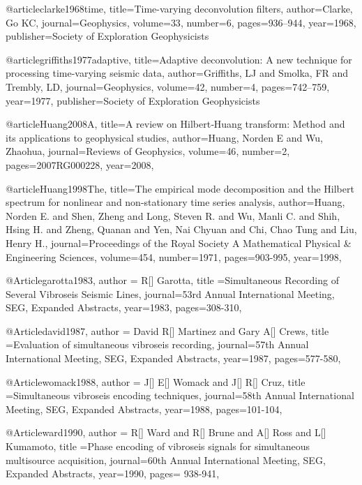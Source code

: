 {@article{clarke1968time,
  title={Time-varying deconvolution filters},
  author={Clarke, Go KC},
  journal={Geophysics},
  volume={33},
  number={6},
  pages={936--944},
  year={1968},
  publisher={Society of Exploration Geophysicists}
}

@article{griffiths1977adaptive,
  title={Adaptive deconvolution: A new technique for processing time-varying seismic data},
  author={Griffiths, LJ and Smolka, FR and Trembly, LD},
  journal={Geophysics},
  volume={42},
  number={4},
  pages={742--759},
  year={1977},
  publisher={Society of Exploration Geophysicists}
}

@article{Huang2008A,
  title={A review on {H}ilbert‐{H}uang transform: {M}ethod and its applications to geophysical studies},
  author={Huang, Norden E and Wu, Zhaohua},
  journal={Reviews of Geophysics},
  volume={46},
  number={2},
  pages={2007RG000228},
  year={2008},
}

@article{Huang1998The,
  title={The empirical mode decomposition and the Hilbert spectrum for nonlinear and non-stationary time series analysis},
  author={Huang, Norden E. and Shen, Zheng and Long, Steven R. and Wu, Manli C. and Shih, Hsing H. and Zheng, Quanan and Yen, Nai Chyuan and Chi, Chao Tung and Liu, Henry H.},
  journal={Proceedings of the Royal Society A Mathematical Physical \& Engineering Sciences},
  volume={454},
  number={1971},
  pages={903-995},
  year={1998},
}


@Article{garotta1983,
  author = {R[] Garotta},
  title ={Simultaneous Recording of Several Vibroseis Seismic Lines},
  journal={53rd Annual International Meeting, SEG, Expanded Abstracts},
  year=1983,
  pages={308-310},
}

@Article{david1987,
  author = {David R[] Martinez and Gary A[] Crews},
  title ={Evaluation of simultaneous vibroseis recording},
  journal={57th Annual International Meeting, SEG, Expanded Abstracts},
  year=1987,
  pages={577-580},
}

@Article{womack1988,
  author = {J[] E[] Womack and J[] R[] Cruz},
  title ={Simultaneous vibroseis encoding techniques},
  journal={58th Annual International Meeting, SEG, Expanded Abstracts},
  year=1988,
  pages={101-104},
}

@Article{ward1990,
  author = {R[] Ward and R[] Brune and A[] Ross and L[] Kumamoto},
  title ={Phase encoding of vibroseis signals for simultaneous multisource acquisition},
  journal={60th Annual International Meeting, SEG, Expanded Abstracts},
  year=1990,
  pages={ 938-941},
}

}
